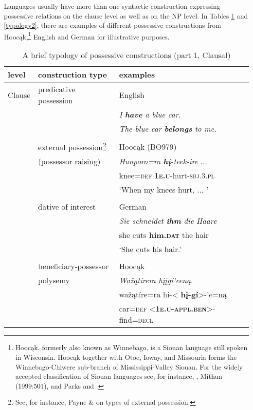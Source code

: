 \documentclass[output=paper]{LSP/langsci}
\begin{document}
Languages usually have more than one syntactic construction expressing possessive relations on the clause level as well as on the NP level. In Tables \ref{typology1} and \ref{typology2}, there are examples of different possessive constructions from Hooc\k{a}k,\footnote{Hooc\k{a}k, formerly also known as Winnebago, is a Siouan language still spoken in Wisconsin. Hooc\k{a}k together with Otoe, Ioway, and Missouria forms the Winnebago-Chiwere sub-branch of Mississippi-Valley Siouan. For the widely accepted classification of Siouan languages see, for instance, \citet{Rood1979}, Mithun (1999:501), and Parks and \citet{Rankin2001}.} English and German for illustrative purposes.

\begin{table}
\caption{A brief typology of possessive constructions (part 1, Clausal)} \label{typology1}
\begin{tabular}{l l l }
\lsptoprule
level & construction type & examples \\
\midrule
Clause& predicative possession 	& English \\ 
& & \textit{I \textbf{have} a blue car}. \\
 & & \textit{The blue car \textbf{belongs} to me}. \\
 & \\
& external possession\footnote{See, for instance, Payne \& \citet{Barshi1999} on types of external possession.} & Hooc\k{a}k (BO979)\\     
& (possessor raising) & \textit{Huuporo=ra \textbf{h\k{i}}-teek-ire} ... \\ 
& & knee=\textsc{def}   \textbf{\textsc{1e.u}}-hurt-\textsc{sbj.3.pl} \\
& & `When my knees hurt, ... ' \\
& \\
& dative of interest & German \\
& & \textit{Sie schneidet \textbf{ihm}           die Haare} \\
& & she cuts         \textbf{him.\textsc{dat}} the hair \\
& & `She cuts his hair.' \\
& \\
&beneficiary-possessor & Hooc\k{a}k \citep[28]{Helmbrecht2003} \\
& polysemy  & \textit{Waž\k{a}tírera hįįgí'een\k{a}}.\\
& & waž\k{a}tíre=ra    hi-< \textbf{hį-gí}>-'e=n\k{a} \\
& & car=\textsc{def}  <\textbf{\textsc{1e.u-appl.ben}}>-find=\textsc{decl} \\

\end{tabular}
\end{table}
\end{document}
